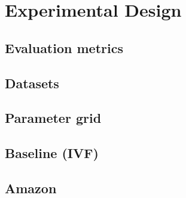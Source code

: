 \section{Experimental Design}


    \subsection{Evaluation metrics}


    \subsection{Datasets}


    \subsection{Parameter grid}


    \subsection{Baseline (IVF)}


    \subsection{Amazon}